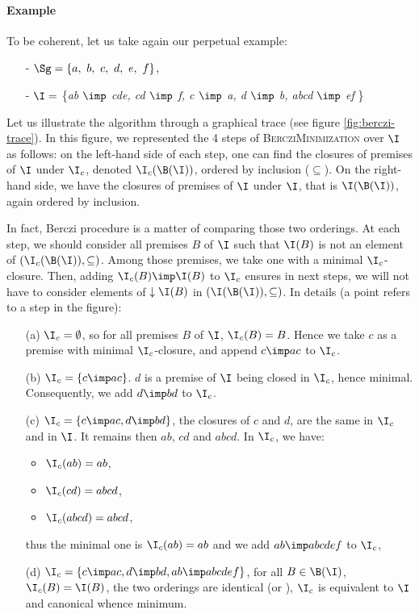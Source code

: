 \paragraph{Example} To be coherent, let us take again our perpetual example:
\begin{itemize}
	\item[-] $\Sg = \{a, \ b, \ c, \ d, \ e, \ f \}$,
	\item[-] $\I =$ \{\textit{ab $\imp$ cde, cd $\imp$ f, c $\imp$ a, d $\imp$ b, abcd $\imp$ ef} \} 
\end{itemize}
Let us illustrate the algorithm through a graphical trace (see figure 
\ref{fig:berczi-trace}). In this figure, we represented the 4 steps of 
\textsc{BercziMinimization} over $\I$ as follows: on the left-hand side of each 
step, one can find the closures of premises of $\I$ under $\I_c$, denoted 
$\I_c(\B(\I))$, ordered by inclusion ($\subseteq$). On the right-hand side, we 
have the closures of premises of $\I$ under $\I$, that is $\I(\B(\I))$, again 
ordered by inclusion.

\vspace{1.2em}

In fact, Berczi procedure is a matter of comparing those two orderings. At each
step, we should consider all premises $B$ of $\I$ such that $\I(B)$ is not an
element of $(\I_c(\B(\I)), \subseteq)$. Among those premises, we take one with
a minimal $\I_c$-closure. Then, adding $\I_c(B) \imp \I(B)$ to $\I_c$ ensures
in next steps, we will not have to consider elements of $\downarrow \I(B)$ in
$(\I(\B(\I)), \subseteq)$. In details (a point refers to a step in the figure):
\begin{itemize}
	\item[(a)] $\I_c = \emptyset$, so for all premises $B$ of $\I$, $\I_c(B) = 
	B$.	Hence we take $c$ as a premise with minimal $\I_c$-closure, and append 
	$c \imp ac$ to $\I_c$.
	\item[(b)] $\I_c = \{ c \imp ac \}$. $d$ is a premise of $\I$ being closed 
	in $\I_c$, hence minimal. Consequently, we add $d \imp bd$ to $\I_c$.
	\item[(c)] $\I_c = \{ c \imp ac, d \imp bd \}$, the closures of $c$ and 
	$d$, are the same in $\I_c$ and in $\I$. It remains then $ab$, $cd$ and 
	$abcd$. In $\I_c$, we have:
	\begin{itemize}
		\item $\I_c(ab) = ab$,
		\item $\I_c(cd) = abcd$,
		\item $\I_c(abcd) = abcd$,
	\end{itemize}
	thus the minimal one is $\I_c(ab) = ab$ and we add $ab \imp abcdef$ to 
	$\I_c$,
	\item[(d)] $\I_c = \{ c \imp ac, d \imp bd, ab \imp abcdef 
	\}$, for all $B \in \B(\I)$, $\I_c(B) = \I(B)$, the two orderings
	are identical (or ), $\I_c$ is equivalent to $\I$ and
	canonical whence minimum.
\end{itemize}


